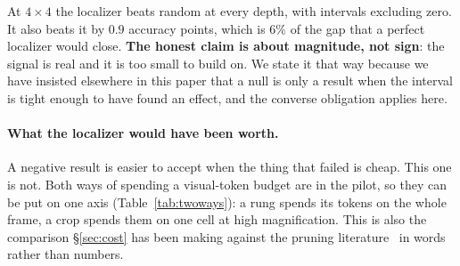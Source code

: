 \documentclass[10pt,twocolumn]{article}
\theoremstyle{plain}
\begin{document}
\begin{table}[t]
\centering\small
\setlength{\tabcolsep}{4pt}
\caption{Localizer margin over random cell choice, $60$ resampled splits.
Random is recomputed on each test fold rather than assumed, since the
cell-correctness rate varies by fold.}
\label{tab:localizer}
\end{table}

At $4\times4$ the localizer beats random at every depth, with intervals
excluding zero. It also beats it by $0.9$ accuracy points, which is $6\%$ of the
gap that a perfect localizer would close. \textbf{The honest claim is about
magnitude, not sign}: the signal is real and it is too small to build on. We
state it that way because we have insisted elsewhere in this paper that a null
is only a result when the interval is tight enough to have found an effect, and
the converse obligation applies here.

\paragraph{What the localizer would have been worth.} A negative result is
easier to accept when the thing that failed is cheap. This one is not. Both
ways of spending a visual-token budget are in the pilot, so they can be put on
one axis (Table~\ref{tab:twoways}): a rung spends its tokens on the whole frame,
a crop spends them on one cell at high magnification. This is also the
comparison \S\ref{sec:cost} has been making against the pruning
literature~\cite{glimpseprune} in words rather than numbers.
\end{document}
